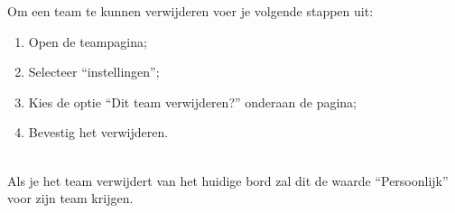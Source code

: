 Om een team te kunnen verwijderen voer je volgende stappen uit:
\begin{enumerate}[nolistsep]
	\item Open de teampagina;
	\item Selecteer ``instellingen'';
	\item Kies de optie ``Dit team verwijderen?'' onderaan de pagina;
	\item Bevestig het verwijderen.
\end{enumerate}

\noindent
\\Als je het team verwijdert van het huidige bord zal dit de waarde ``Persoonlijk'' voor zijn team krijgen.